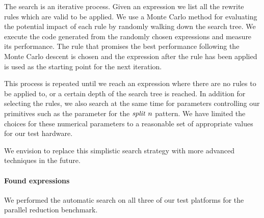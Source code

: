 The search is an iterative process.
Given an expression we list all the rewrite rules which are valid to be applied.
We use a Monte Carlo method for evaluating the potential impact of each rule by randomly walking down the search tree.
We execute the code generated from the randomly chosen expressions and measure its performance.
The rule that promises the best performance following the Monte Carlo descent is chosen and the expression after the rule has been applied is used as the starting point for the next iteration.

This process is repeated until we reach an expression where there are no rules to be applied to, or a certain depth of the search tree is reached.
In addition for selecting the rules, we also search at the same time for parameters controlling our primitives such as the parameter for the $\text{\textit{split}}\ n$ pattern.
We have limited the choices for these numerical parameters to a reasonable set of appropriate values for our test hardware.

We envision to replace this simplistic search strategy with more advanced techniques in the future.

\paragraph{Found expressions}
We performed the automatic search on all three of our test platforms for the parallel reduction benchmark.

